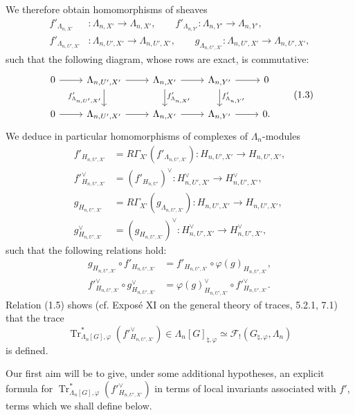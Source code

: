 \documentclass[11pt]{article}
\providecommand{\Tr}{\operatorname{Tr}}
\providecommand{\Tr}{\operatorname{Tr}}
\providecommand{\Tr}{\operatorname{Tr}}
\providecommand{\Tr}{\operatorname{Tr}}
\providecommand{\La}{\Lambda}
\providecommand{\Tr}{\operatorname{Tr}}
\begin{document}
We therefore obtain homomorphisms of sheaves
\begin{align*}
f'_{\La_{n,X'}} &: \La_{n,X'}\longrightarrow \La_{n,X'},\qquad
f'_{\La_{n,Y'}} : \La_{n,Y'}\longrightarrow \La_{n,Y'},\\
f'_{\La_{n,U',X'}} &: \La_{n,U',X'}\longrightarrow \La_{n,U',X'},
\qquad
g_{\La_{n,U',X'}} : \La_{n,U',X'}\longrightarrow \La_{n,U',X'},
\end{align*}
such that the following diagram, whose rows are exact, is commutative:
\[
\begin{tikzcd}
0 \arrow[r] & \La_{n,U',X'} \arrow[r] \arrow[d,"f'_{\La_{n,U',X'}}"'] & \La_{n,X'} \arrow[r] \arrow[d,"f'_{\La_{n,X'}}"] & \La_{n,Y'} \arrow[r] \arrow[d,"f'_{\La_{n,Y'}}"] & 0 \\
0 \arrow[r] & \La_{n,U',X'} \arrow[r] & \La_{n,X'} \arrow[r] & \La_{n,Y'} \arrow[r] & 0 .
\end{tikzcd}
\tag{1.3}
\]
We deduce in particular homomorphisms of complexes of $\La_n$-modules
\begin{align*}
f'_{H_{n,U',X'}}&=R\Gamma_{X'}(f'_{\La_{n,U',X'}}):H_{n,U',X'}\to H_{n,U',X'},\\
f'^\vee_{H_{n,U',X'}}&=(f'_{H_{n,U'}})^\vee:H_{n,U',X'}^\vee\to H_{n,U',X'}^\vee,\\
g_{H_{n,U',X'}}&=R\Gamma_{X'}(g_{\La_{n,U',X'}}):H_{n,U',X'}\to H_{n,U',X'},\\
g^\vee_{H_{n,U',X'}}&=(g_{H_{n,U',X'}})^\vee:H_{n,U',X'}^\vee\to H_{n,U',X'}^\vee,
\end{align*}
such that the following relations hold:
\begin{align}
\tag{1.4}g_{H_{n,U',X'}}\circ f'_{H_{n,U',X'}}&=f'_{H_{n,U',X'}}\circ \varphi(g)_{H_{n,U',X'}},\\
\tag{1.5}f'^\vee_{H_{n,U',X'}}\circ g^\vee_{H_{n,U',X'}}&=\varphi(g)^\vee_{H_{n,U',X'}}\circ f'^\vee_{H_{n,U',X'}} .
\end{align}
Relation (1.5) shows (cf. Exposé XI on the general theory of traces, 5.2.1, 7.1) that the trace
\[
\Tr^*_{\La_n[G],\varphi}(f'^\vee_{H_{n,U',X'}})
\in \La_n[G]_{\natural,\varphi}\simeq \mathcal F_!(G_{\natural,\varphi},\La_n)
\]
is defined.

Our first aim will be to give, under some additional hypotheses, an explicit formula for $\Tr^*_{\La_n[G],\varphi}(f'^\vee_{H_{n,U',X'}})$ in terms of local invariants associated with $f'$, terms which we shall define below.
\end{document}
